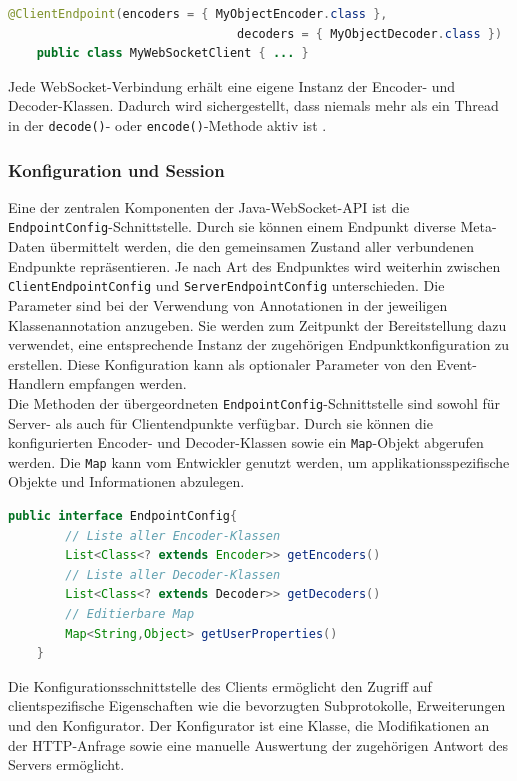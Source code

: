 \documentclass[11pt,a4paper,titlepage]{scrartcl}
\numberwithin{equation}{section}
\begin{document}
\begin{lstlisting}[frame=single, language=Java, caption=Java: Angabe der Encoder- und Decoder-Klassen]
	@ClientEndpoint(encoders = { MyObjectEncoder.class }, 
								decoders = { MyObjectDecoder.class })
	public class MyWebSocketClient { ... }
\end{lstlisting}

\noindent Jede WebSocket-Verbindung erhält eine eigene Instanz der Encoder- und Decoder-Klassen. Dadurch wird sichergestellt, dass niemals mehr als ein Thread in der \texttt{decode()}- oder \texttt{encode()}-Methode aktiv ist \autocite[82]{coward_java_2014}. 

\subsubsection{Konfiguration und Session}
Eine der zentralen Komponenten der Java-WebSocket-API ist die \texttt{EndpointConfig}-Schnittstelle. Durch sie können einem Endpunkt diverse Meta-Daten übermittelt werden, die den gemeinsamen Zustand aller verbundenen Endpunkte repräsentieren. Je nach Art des Endpunktes wird weiterhin zwischen \texttt{ClientEndpointConfig} und \texttt{ServerEndpointConfig} unterschieden. Die Parameter sind bei der Verwendung von Annotationen in der jeweiligen Klassenannotation anzugeben. Sie werden zum Zeitpunkt der Bereitstellung dazu verwendet, eine entsprechende Instanz der zugehörigen Endpunktkonfiguration zu erstellen. Diese Konfiguration kann als optionaler Parameter von den Event-Handlern empfangen werden.\\

\noindent Die Methoden der übergeordneten \texttt{EndpointConfig}-Schnittstelle sind sowohl für Server- als auch für Clientendpunkte verfügbar. Durch sie können die konfigurierten Encoder- und Decoder-Klassen sowie ein \texttt{Map}-Objekt abgerufen werden. Die \texttt{Map} kann vom Entwickler genutzt werden, um applikationsspezifische Objekte und Informationen abzulegen. \medskip

\begin{lstlisting}[frame=single, language=Java, caption=Java: EndpointConfig]
	public interface EndpointConfig{
		// Liste aller Encoder-Klassen
		List<Class<? extends Encoder>> getEncoders()
		// Liste aller Decoder-Klassen
		List<Class<? extends Decoder>> getDecoders()
		// Editierbare Map
		Map<String,Object> getUserProperties()
	}
\end{lstlisting}
\noindent Die Konfigurationsschnittstelle des Clients ermöglicht den Zugriff auf clientspezifische Eigenschaften wie die bevorzugten Subprotokolle, Erweiterungen und den Konfigurator. Der Konfigurator ist eine Klasse, die Modifikationen an der HTTP-Anfrage sowie eine manuelle Auswertung der zugehörigen Antwort des Servers ermöglicht.
\end{document}
